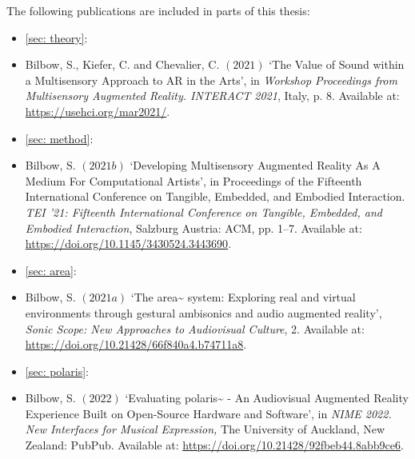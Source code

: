 \newpage \vspace*{4cm}

The following publications are included in parts of this thesis:
\begin{itemize}
    
    \item[] \autoref{sec: theory}:  \\ \citep{bilbow2021}
    \item[] Bilbow, S., Kiefer, C. and Chevalier, C. $(2021)$ `The Value of Sound within a Multisensory Approach to AR in the Arts', in \textit{Workshop Proceedings from Multisensory Augmented Reality. INTERACT 2021}, Italy, p. 8. Available at: \url{https://usehci.org/mar2021/}.
    
    \vspace*{1cm}
    \item[] \autoref{sec: method}:  \\ \citep{bilbow2021b}
    \item[] Bilbow, S. $(2021b)$ `Developing Multisensory Augmented Reality As A Medium For Computational Artists', in Proceedings of the Fifteenth International Conference on Tangible, Embedded, and Embodied Interaction. \textit{TEI '21: Fifteenth International Conference on Tangible, Embedded, and Embodied Interaction}, Salzburg Austria: ACM, pp. 1–7. Available at: \url{https://doi.org/10.1145/3430524.3443690}.
    
    \vspace*{1cm}
    \item[] \autoref{sec: area}:  \\ \citep{bilbow2021a}
    \item[] Bilbow, S. $(2021a)$ `The area\textasciitilde{} system: Exploring real and virtual environments through gestural ambisonics and audio augmented reality', \textit{Sonic Scope: New Approaches to Audiovisual Culture}, 2. Available at: \url{https://doi.org/10.21428/66f840a4.b74711a8}.
    
    \vspace*{1cm}
    \item[] \autoref{sec: polaris}:  \\ \citep{bilbow2022}
    \item[] Bilbow, S. $(2022)$ `Evaluating polaris\textasciitilde{} - An Audiovisual Augmented Reality Experience Built on Open-Source Hardware and Software', in \textit{NIME 2022. New Interfaces for Musical Expression,} The University of Auckland, New Zealand: PubPub. Available at: \url{https://doi.org/10.21428/92fbeb44.8abb9ce6}.
    
\end{itemize}